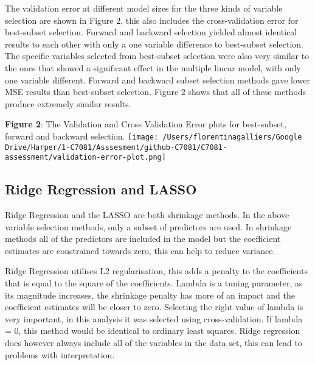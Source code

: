 \documentclass[
]{article}
\begin{document}
The validation error at different model sizes for the three kinds of
variable selection are shown in Figure 2, this also includes the
cross-validation error for best-subset selection. Forward and backward
selection yielded almost identical results to each other with only a one
variable difference to best-subset selection. The specific variables
selected from best-subset selection were also very similar to the ones
that showed a significant effect in the multiple linear model, with only
one variable different. Forward and backward subset selection methods
gave lower MSE results than best-subset selection. Figure 2 shows that
all of these methods produce extremely similar results.

\newpage

\textbf{Figure 2}: The Validation and Cross Validation Error plots for
best-subset, forward and backward selection.
\texttt{[image: /Users/florentinagalliers/Google Drive/Harper/1-C7081/Asssesment/github-C7081/C7081-assessment/validation-error-plot.png]}

\hypertarget{ridge-regression-and-lasso}{%
\subsection{Ridge Regression and
LASSO}\label{ridge-regression-and-lasso}}

Ridge Regression and the LASSO are both shrinkage methods. In the above
variable selection methods, only a subset of predictors are used. In
shrinkage methods all of the predictors are included in the model but
the coefficient estimates are constrained towards zero, this can help to
reduce variance.

Ridge Regression utilises L2 regularisation, this adds a penalty to the
coefficients that is equal to the square of the coefficients. Lambda is
a tuning parameter, as its magnitude increases, the shrinkage penalty
has more of an impact and the coefficient estimates will be closer to
zero. Selecting the right value of lambda is very important, in this
analysis it was selected using cross-validation. If lambda = 0, this
method would be identical to ordinary least squares. Ridge regression
does however always include all of the variables in the data set, this
can lead to problems with interpretation.
\end{document}
